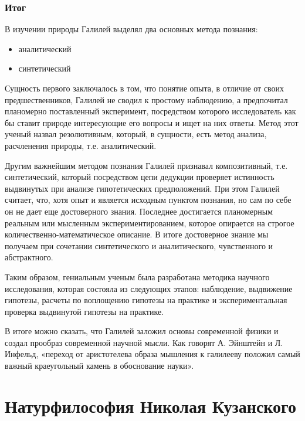 \documentclass[
]{article}
\providecommand{\tightlist}{%
  \setlength{\itemsep}{0pt}\setlength{\parskip}{0pt}}
\begin{document}
\hypertarget{ux438ux442ux43eux433-6}{%
\subsubsection{Итог}\label{ux438ux442ux43eux433-6}}

В изучении природы Галилей выделял два основных метода познания:

\begin{itemize}
\tightlist
\item
  аналитический
\item
  синтетический
\end{itemize}

Сущность первого заключалось в том, что понятие опыта, в отличие от
своих предшественников, Галилей не сводил к простому наблюдению, а
предпочитал планомерно поставленный эксперимент, посредством которого
исследователь как бы ставит природе интересующие его вопросы и ищет на
них ответы. Метод этот ученый назвал резолютивным, который, в сущности,
есть метод анализа, расчленения природы, т.е. аналитический.

Другим важнейшим методом познания Галилей признавал композитивный, т.е.
синтетический, который посредством цепи дедукции проверяет истинность
выдвинутых при анализе гипотетических предположений. При этом Галилей
считает, что, хотя опыт и является исходным пунктом познания, но сам по
себе он не дает еще достоверного знания. Последнее достигается
планомерным реальным или мысленным экспериментированием, которое
опирается на строгое количественно-математическое описание. В итоге
достоверное знание мы получаем при сочетании синтетического и
аналитического, чувственного и абстрактного.

Таким образом, гениальным ученым была разработана методика научного
исследования, которая состояла из следующих этапов: наблюдение,
выдвижение гипотезы, расчеты по воплощению гипотезы на практике и
экспериментальная проверка выдвинутой гипотезы на практике.

В итоге можно сказать, что Галилей заложил основы современной физики и
создал прообраз современной научной мысли. Как говорят А. Эйнштейн и Л.
Инфельд, «переход от аристотелева образа мышления к галилееву положил
самый важный краеугольный камень в обоснование науки».

\hypertarget{ux43dux430ux442ux443ux440ux444ux438ux43bux43eux441ux43eux444ux438ux44f-ux43dux438ux43aux43eux43bux430ux44f-ux43aux443ux437ux430ux43dux441ux43aux43eux433ux43e}{%
\section{Натурфилософия Николая
Кузанского}\label{ux43dux430ux442ux443ux440ux444ux438ux43bux43eux441ux43eux444ux438ux44f-ux43dux438ux43aux43eux43bux430ux44f-ux43aux443ux437ux430ux43dux441ux43aux43eux433ux43e}}
\end{document}
